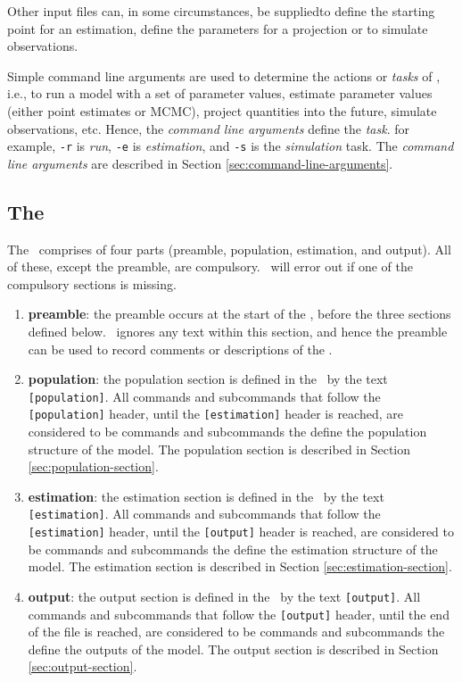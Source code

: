 Other input files can, in some circumstances, be supplied\textemdash to define the starting point for an estimation, define the parameters for a projection or to simulate observations.  

Simple command line arguments are used to determine the actions or \emph{tasks} of \SPM, i.e., to run a model with a set of parameter values, estimate parameter values (either point estimates or MCMC), project quantities into the future, simulate observations, etc. Hence, the \emph{command line arguments} define the \emph{task}. for example, \texttt{-r} is \emph{run}, \texttt{-e} is \emph{estimation}, and \texttt{-s} is the \emph{simulation} task. The \emph{command line arguments} are described in Section \ref{sec:command-line-arguments}.

\subsection{The \config\label{config-files}}

The \config\ comprises of four parts (preamble, population, estimation, and output). All of these, except the preamble, are compulsory. \SPM\ will error out if one of the compulsory sections is missing.

\begin{enumerate}
\item \textbf{preamble}: 
the preamble occurs at the start of the \config, before the three sections defined below. \SPM\ ignores any text within this section, and hence the preamble can be used to record comments or descriptions of the \config. 

\item \textbf{population}: 
the population section is defined in the \config\ by the text \texttt{[population]}. All commands and subcommands that follow the \texttt{[population]} header, until the \texttt{[estimation]} header is reached, are considered to be commands and subcommands the define the population structure of the model. The population section is described in Section \ref{sec:population-section}.

\item \textbf{estimation}:
the estimation section is defined in the \config\ by the text \texttt{[estimation]}. All commands and subcommands that follow the \texttt{[estimation]} header, until the \texttt{[output]} header is reached, are considered to be commands and subcommands the define the estimation structure of the model.  The estimation section is described in Section \ref{sec:estimation-section}.

\item \textbf{output}:
the output section is defined in the \config\ by the text \texttt{[output]}. All commands and subcommands that follow the \texttt{[output]} header, until the end of the file is reached, are considered to be commands and subcommands the define the outputs of the model.  The output section is described in Section \ref{sec:output-section}.

\end{enumerate}

